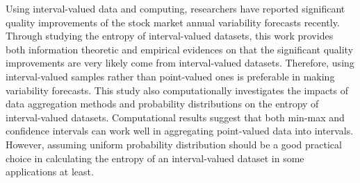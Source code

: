 
Using interval-valued data and computing, researchers have reported significant quality improvements of the stock market annual variability forecasts recently. Through studying the entropy of interval-valued datasets, this work provides both information theoretic and empirical evidences on that the significant quality improvements are very likely come from interval-valued datasets.  
Therefore, using interval-valued samples rather than point-valued ones is preferable in making variability forecasts. 
This study also computationally investigates the impacts of data aggregation methods and probability distributions on the entropy of interval-valued datasets. Computational results suggest that both min-max and confidence intervals can work well in aggregating point-valued data into intervals. However, assuming uniform probability distribution should be a good practical choice in calculating the entropy of an interval-valued dataset in some applications at least. %

